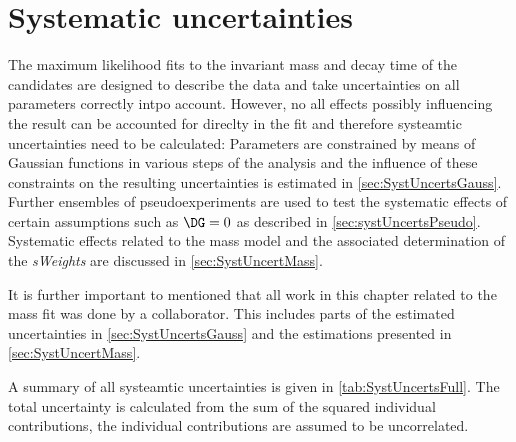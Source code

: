 \chapter{Systematic uncertainties}
\label{ch:systeamticUncerts}

\linespread{1.08}\selectfont
The maximum likelihood fits to the invariant mass and decay time of the \BdToDpi candidates are designed to describe the data and take uncertainties on all parameters correctly intpo account.
However, no all effects possibly influencing the result can be accounted for direclty in the fit and therefore systeamtic uncertainties need to be calculated:
Parameters are constrained by means of Gaussian functions in various steps of the analysis and the influence of these constraints on the resulting uncertainties is estimated in \cref{sec:SystUncertsGauss}.
Further ensembles of pseudoexperiments are used to test the systematic effects of certain assumptions such as $\DG=0$  as described in \cref{sec:systUncertsPseudo}.
Systematic effects related to the mass model and the associated determination of the \emph{sWeights} are discussed in \cref{sec:SystUncertMass}.

It is further important to mentioned that all work in this chapter related to the mass fit was done by a collaborator.
This includes parts of the estimated uncertainties in \cref{sec:SystUncertsGauss} and the estimations presented in \cref{sec:SystUncertMass}.

A summary of all systeamtic uncertainties is given in \cref{tab:SystUncertsFull}.
The total uncertainty is calculated from the sum of the squared individual contributions, \ie the individual contributions are assumed to be uncorrelated.

